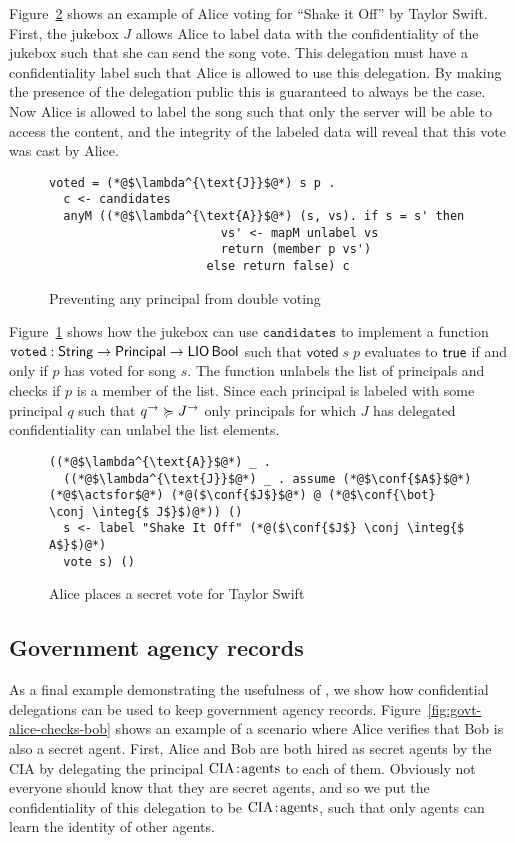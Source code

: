 Figure~\ref{fig:jukebox-alice-votes-for-taylor-swift} shows an example of Alice voting for ``Shake it Off'' by Taylor Swift. First, the jukebox $J$ allows Alice to label data with the confidentiality of the jukebox such that she can send the song vote. This delegation must have a confidentiality label such that Alice is allowed to use this delegation. By making the presence of the delegation public this is guaranteed to always be the case. Now Alice is allowed to label the song such that only the server will be able to access the content, and the integrity of the labeled data will reveal that this vote was cast by Alice.

\begin{figure}
\centering
\begin{lstlisting}
voted = (*@$\lambda^{\text{J}}$@*) s p .
  c <- candidates
  anyM ((*@$\lambda^{\text{A}}$@*) (s, vs). if s = s' then
                        vs' <- mapM unlabel vs
                        return (member p vs')
                      else return false) c
\end{lstlisting}
\caption{Preventing any principal from double voting}
\label{fig:prevent-double-voting}
\end{figure}

Figure~\ref{fig:prevent-double-voting} shows how the jukebox can use $\mathtt{candidates}$ to implement a function $\mathtt{voted}: \mathsf{String} \to \mathsf{Principal} \to \mathsf{LIO}\,\mathsf{Bool}$ such that $\mathsf{voted}\; s\; p$ evaluates to $\mathsf{true}$ if and only if $p$ has voted for song $s$. The function unlabels the list of principals and checks if $p$ is a member of the list. Since each principal is labeled with some principal $q$ such that $q^{\rightarrow} \succcurlyeq J^{\rightarrow}$ only principals for which $J$ has delegated confidentiality can unlabel the list elements.

\begin{figure}
\centering
\begin{lstlisting}
((*@$\lambda^{\text{A}}$@*) _ .
  ((*@$\lambda^{\text{J}}$@*) _ . assume (*@$\conf{$A$}$@*) (*@$\actsfor$@*) (*@($\conf{$J$}$@*) @ (*@$\conf{\bot} \conj \integ{$ J$}$)@*)) ()
  s <- label "Shake It Off" (*@($\conf{$J$} \conj \integ{$ A$}$)@*)
  vote s) ()
\end{lstlisting}
\caption{Alice places a secret vote for Taylor Swift}
\label{fig:jukebox-alice-votes-for-taylor-swift}
\end{figure}

\subsection{Government agency records}
As a final example demonstrating the usefulness of \lang, we show how confidential delegations can be used to keep government agency records. Figure~\ref{fig:govt-alice-checks-bob} shows an example of a scenario where Alice verifies that Bob is also a secret agent. First, Alice and Bob are both hired as secret agents by the CIA by delegating the principal $\text{CIA}\!:\!\text{agents}$ to each of them. Obviously not everyone should know that they are secret agents, and so we put the confidentiality of this delegation to be $\text{CIA}\!:\!\text{agents}$, such that only agents can learn the identity of other agents.

